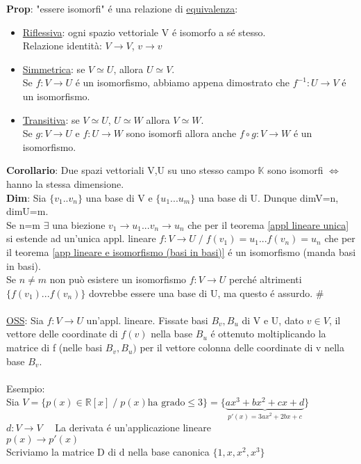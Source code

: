 \documentclass[12pt]{article}
\begin{document}
\textbf{Prop}: "essere isomorfi" é una relazione di \underline{equivalenza}:
\begin{itemize}
    \item \underline{Riflessiva}: ogni spazio vettoriale V é isomorfo a sé stesso.\\
    Relazione identità: $V\longrightarrow V$, $v\longrightarrow v$
    \item \underline{Simmetrica}: se $V \simeq U$, allora $U \simeq V$.\\
    Se $f: V \longrightarrow U$ é un isomorfismo, abbiamo appena dimostrato che $f^{-1}:U\longrightarrow V$ é un isomorfismo.
    \item \underline{Transitiva}: se $V\simeq U$, $U\simeq W$ allora $V \simeq W$.\\
    Se $g: V\longrightarrow U$ e $f:U\longrightarrow W$ sono isomorfi allora anche $f\circ g: V\longrightarrow W$ é un isomorfismo.
    
\end{itemize}

\noindent\textbf{Corollario}: Due spazi vettoriali V,U su uno stesso campo $\mathbb{K}$ sono isomorfi $\iff$ hanno la stessa dimensione.\\
\textbf{Dim}: Sia $\{v_1..v_n\}$ una base di V e $\{u_1...u_m\}$ una base di U. Dunque dimV=n, dimU=m.\\
Se n=m $\exists$ una biezione $v_1\rightarrow u_1... v_n\rightarrow u_n$ che per il teorema \ref{appl lineare unica} si estende ad un'unica appl. lineare $f:V\longrightarrow U \;/\; f(v_1) = u_1...f(v_n) = u_n$ che per il teorema \ref{app lineare e isomorfismo (basi in basi)} é un isomorfismo (manda basi in basi).\\
Se $n\neq m$ non può esistere un isomorfismo $f:V\longrightarrow U$ perché altrimenti $\{f(v_1)...f(v_n)\}$ dovrebbe essere una base di U, ma questo é assurdo. \#\\\\
\underline{OSS}: Sia $f:V\longrightarrow U$ un'appl. lineare. Fissate basi $B_v, B_u$ di V e U, dato $v\in V$, il vettore delle coordinate di $f(v)$ nella base $B_u$ é ottenuto moltiplicando la matrice di f (nelle basi $B_v, B_u)$ per il vettore colonna delle coordinate di v nella base $B_v$.\\\\
Esempio:\\
Sia $V = \{p(x) \in \mathbb{R}[x] \;/\; p(x)\text{ha grado} \leq 3\} = \{\underbrace{ax^3+bx^2+cx+d}_{p'(x) = 3ax^2+2bx+c}\}$\\
$d:V\longrightarrow V\quad$ La derivata é un'applicazione lineare\\
$p(x)\rightarrow p'(x)$\\
Scriviamo la matrice D di d nella base canonica $\{1,x,x^2,x^3\}$\\
\end{document}
